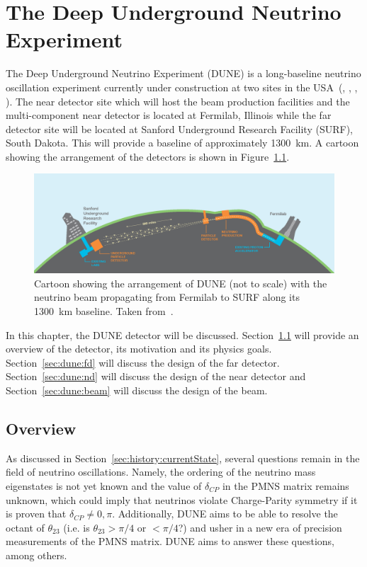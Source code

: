 \chapter{The Deep Underground Neutrino Experiment}
\label{ch:dune}

The Deep Underground Neutrino Experiment (DUNE) is a long-baseline neutrino oscillation experiment currently under construction at two sites in the USA~(\cite{tdrVol1}, \cite{tdrVol2}, \cite{tdrVol3}, \cite{tdrVol4}).
The near detector site which will host the beam production facilities and the multi-component near detector is located at Fermilab, Illinois while the far detector site will be located at Sanford Underground Research Facility (SURF), South Dakota.
This will provide a baseline of approximately 1300~km.
A cartoon showing the arrangement of the detectors is shown in Figure~\ref{fig:duneCartoon}.

\begin{figure}[h]
  \centering
  \includegraphics[width=.9\linewidth]{files/figures/dune_detector/duneCartoon}
  \caption{Cartoon showing the arrangement of DUNE (not to scale) with the neutrino beam propagating from Fermilab to SURF along its 1300~km baseline. Taken from~\cite{tdrVol1}.}
  \label{fig:duneCartoon}
\end{figure}

In this chapter, the DUNE detector will be discussed.
Section~\ref{sec:dune:overview} will provide an overview of the detector, its motivation and its physics goals.
Section~\ref{sec:dune:fd} will discuss the design of the far detector.
Section~\ref{sec:dune:nd} will discuss the design of the near detector and Section~\ref{sec:dune:beam} will discuss the design of the beam.

\section{Overview}
\label{sec:dune:overview}
As discussed in Section~\ref{sec:history:currentState}, several questions remain in the field of neutrino oscillations.
Namely, the ordering of the neutrino mass eigenstates is not yet known and the value of $\delta_{CP}$ in the PMNS matrix remains unknown, which could imply that neutrinos violate Charge-Parity symmetry if it is proven that $\delta_{CP} \neq 0, \pi$.
Additionally, DUNE aims to be able to resolve the octant of $\theta_{23}$ (i.e. is $\theta_{23} > \pi/4$ or $< \pi/4$?) and usher in a new era of precision measurements of the PMNS matrix. 
DUNE aims to answer these questions, among others.

